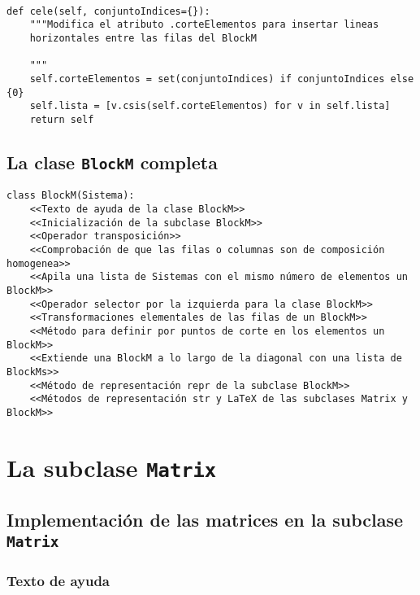 \documentclass[11pt]{report}
\begin{document}
\begin{verbatim}

def cele(self, conjuntoIndices={}):
    """Modifica el atributo .corteElementos para insertar lineas
    horizontales entre las filas del BlockM

    """
    self.corteElementos = set(conjuntoIndices) if conjuntoIndices else {0}
    self.lista = [v.csis(self.corteElementos) for v in self.lista]
    return self

\end{verbatim}


\clearpage

\section{La clase \texttt{BlockM} completa}
\label{sec:orgbeef78c}

\begin{verbatim}
class BlockM(Sistema):
    <<Texto de ayuda de la clase BlockM>>
    <<Inicialización de la subclase BlockM>>
    <<Operador transposición>>
    <<Comprobación de que las filas o columnas son de composición homogenea>>
    <<Apila una lista de Sistemas con el mismo número de elementos un BlockM>>
    <<Operador selector por la izquierda para la clase BlockM>>
    <<Transformaciones elementales de las filas de un BlockM>>
    <<Método para definir por puntos de corte en los elementos un BlockM>>
    <<Extiende una BlockM a lo largo de la diagonal con una lista de BlockMs>>
    <<Método de representación repr de la subclase BlockM>>
    <<Métodos de representación str y LaTeX de las subclases Matrix y BlockM>>
\end{verbatim}


\chapter{La subclase \texttt{Matrix}}
\label{sec:org1719bd4}

\section{Implementación de las matrices en la subclase \texttt{Matrix}}
\label{sec:org8e93235}

\subsection{Texto de ayuda}
\label{sec:org37e5393}
\end{document}
